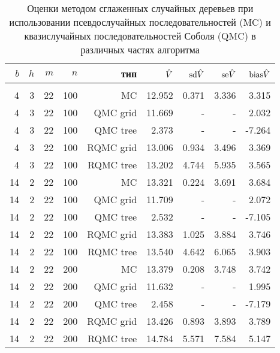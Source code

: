\begin{table}
    \renewcommand{\arraystretch}{0.6}
    \centering
    \caption{Оценки методом сглаженных случайных деревьев при использовании псевдослучайных последовательностей (MC) и квазислучайных последовательностей Соболя (QMC) в различных частях алгоритма}\label{tbl:pruned_tree_sobol}
    \begin{tabular}{rrrrrrrrr}
    $b$&$h$&$m$&$n$&тип&$\hat{V}$&$\mathrm{sd}\hat{V}$&$\mathrm{se}\hat{V}$&$\mathrm{bias}\hat{V}$\\[3pt]\hline\\[-8pt]
    4&3&22&100&MC&12.952&0.371&3.336&3.315\\
    4&3&22&100&QMC grid&11.669&-&-&2.032\\
    4&3&22&100&QMC tree&2.373&-&-&-7.264\\
    4&3&22&100&RQMC grid&13.006&0.934&3.496&3.369\\
    4&3&22&100&RQMC tree&13.202&4.744&5.935&3.565\\[3pt]
    14&2&22&100&MC&13.321&0.224&3.691&3.684\\
    14&2&22&100&QMC grid&11.709&-&-&2.072\\
    14&2&22&100&QMC tree&2.532&-&-&-7.105\\
    14&2&22&100&RQMC grid&13.383&1.025&3.884&3.746\\
    14&2&22&100&RQMC tree&13.540&4.642&6.065&3.903\\[3pt]
    14&2&22&200&MC&13.379&0.208&3.748&3.742\\
    14&2&22&200&QMC grid&11.632&-&-&1.995\\
    14&2&22&200&QMC tree&2.458&-&-&-7.179\\
    14&2&22&200&RQMC grid&13.426&0.893&3.893&3.789\\
    14&2&22&200&RQMC tree&14.784&5.571&7.584&5.147\\[3pt]
    \end{tabular}
\end{table}
